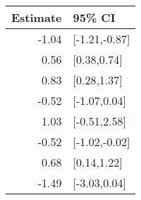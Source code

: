 \begin{tabular}{rl}
  \hline
Estimate & 95\% CI \\ 
  \hline
-1.04 & [-1.21,-0.87] \\ 
  0.56 & [0.38,0.74] \\ 
  0.83 & [0.28,1.37] \\ 
  -0.52 & [-1.07,0.04] \\ 
  1.03 & [-0.51,2.58] \\ 
  -0.52 & [-1.02,-0.02] \\ 
  0.68 & [0.14,1.22] \\ 
  -1.49 & [-3.03,0.04] \\ 
   \hline
\end{tabular}

